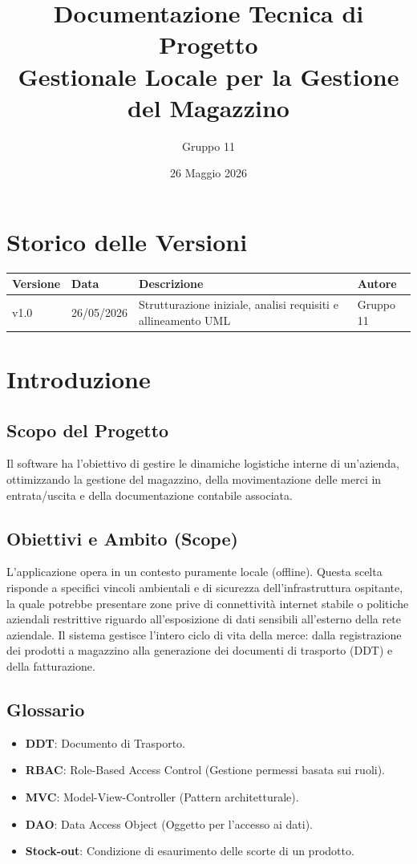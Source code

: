 \documentclass[a4paper,12pt]{article}
\title{Documentazione Tecnica di Progetto \\ \large Gestionale Locale per la Gestione del Magazzino}
\author{Gruppo 11}
\date{26 Maggio 2026}
\begin{document}
\maketitle

\section*{Storico delle Versioni}
\begin{center}
\begin{tabular}{llll}
\toprule
\textbf{Versione} & \textbf{Data} & \textbf{Descrizione} & \textbf{Autore} \\
\midrule
v1.0 & 26/05/2026 & Strutturazione iniziale, analisi requisiti e allineamento UML & Gruppo 11 \\
\bottomrule
\end{tabular}
\end{center}

\newpage
\tableofcontents
\newpage

\section{Introduzione}
\subsection{Scopo del Progetto}
Il software ha l'obiettivo di gestire le dinamiche logistiche interne di un'azienda, ottimizzando la gestione del magazzino, della movimentazione delle merci in entrata/uscita e della documentazione contabile associata.

\subsection{Obiettivi e Ambito (Scope)}
L'applicazione opera in un contesto puramente locale (offline). Questa scelta risponde a specifici vincoli ambientali e di sicurezza dell'infrastruttura ospitante, la quale potrebbe presentare zone prive di connettività internet stabile o politiche aziendali restrittive riguardo all'esposizione di dati sensibili all'esterno della rete aziendale. Il sistema gestisce l'intero ciclo di vita della merce: dalla registrazione dei prodotti a magazzino alla generazione dei documenti di trasporto (DDT) e della fatturazione.

\subsection{Glossario}
\begin{itemize}
    \item \textbf{DDT}: Documento di Trasporto.
    \item \textbf{RBAC}: Role-Based Access Control (Gestione permessi basata sui ruoli).
    \item \textbf{MVC}: Model-View-Controller (Pattern architetturale).
    \item \textbf{DAO}: Data Access Object (Oggetto per l'accesso ai dati).
    \item \textbf{Stock-out}: Condizione di esaurimento delle scorte di un prodotto.
\end{itemize}
\end{document}

